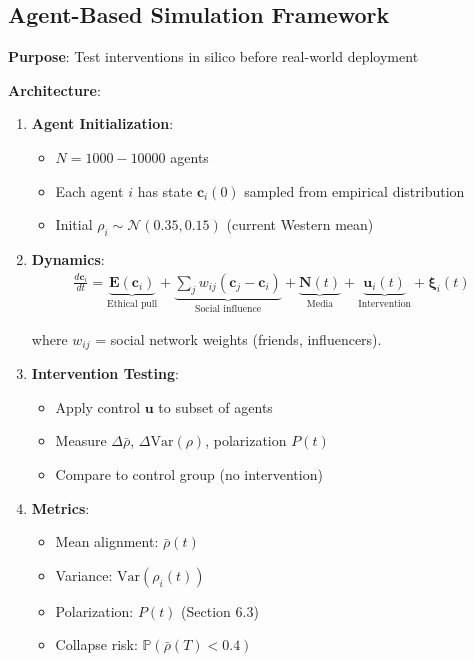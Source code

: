 \documentclass[11pt,a4paper]{article}
\theoremstyle{definition}
\theoremstyle{remark}
\newcommand{\EE}{\mathbf{E}}
\newcommand{\cc}{\mathbf{c}}
\begin{document}
\begin{enumerate}
\subsection{Agent-Based Simulation Framework}

\begin{protocol}
\textbf{Purpose}: Test interventions in silico before real-world deployment

\textbf{Architecture}:
\begin{enumerate}
    \item \textbf{Agent Initialization}:
        \begin{itemize}
            \item \(N = 1000-10000\) agents
            \item Each agent \(i\) has state \(\cc_i(0)\) sampled from empirical distribution
            \item Initial \(\rho_i \sim \mathcal{N}(0.35, 0.15)\) (current Western mean)
        \end{itemize}
    
    \item \textbf{Dynamics}:
        \begin{align}
        \frac{d\cc_i}{dt} = \underbrace{\EE(\cc_i)}_{\text{Ethical pull}} + \underbrace{\sum_j w_{ij}(\cc_j - \cc_i)}_{\text{Social influence}} + \underbrace{\mathbf{N}(t)}_{\text{Media}} + \underbrace{\mathbf{u}_i(t)}_{\text{Intervention}} + \boldsymbol{\xi}_i(t)
        \end{align}
        
        where \(w_{ij}\) = social network weights (friends, influencers).
    
    \item \textbf{Intervention Testing}:
        \begin{itemize}
            \item Apply control \(\mathbf{u}\) to subset of agents
            \item Measure \(\Delta\bar{\rho}\), \(\Delta\text{Var}(\rho)\), polarization \(P(t)\)
            \item Compare to control group (no intervention)
        \end{itemize}
    
    \item \textbf{Metrics}:
        \begin{itemize}
            \item Mean alignment: \(\bar{\rho}(t)\)
            \item Variance: \(\text{Var}(\rho_i(t))\)
            \item Polarization: \(P(t)\) (Section 6.3)
            \item Collapse risk: \(\mathbb{P}(\bar{\rho}(T) < 0.4)\)
        \end{itemize}
\end{enumerate}


\end{protocol}
\end{enumerate}
\end{document}
